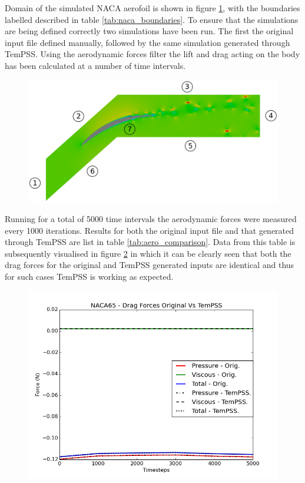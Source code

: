 \documentclass[11pt, a4paper]{report}
\begin{document}
Domain of the simulated NACA aerofoil is shown in figure \ref{fig:naca_domain}, with the boundaries labelled described in table \ref{tab:naca_boundaries}. To ensure that the simulations are being defined correctly two simulations have been run. The first the original input file defined manually, followed by the same simulation generated through TemPSS. Using the aerodynamic forces filter the lift and drag acting on the body has been calculated at a number of time intervals.

\begin{figure}[htb!]
 \centering
 \includegraphics[width=.75\linewidth,  clip=true, trim = 0cm 0cm 0cm 0cm]{naca_domain}
 \label{fig:naca_domain}
\end{figure}

Running for a total of 5000 time intervals the aerodynamic forces were measured every 1000 iterations. Results for both the original input file and that generated through TemPSS are list in table \ref{tab:aero_comparison}. Data from this table is subsequently visualised in figure \ref{fig:drag_lift_comparison} in which it can be clearly seen that both the drag forces for the original and TemPSS generated inputs are identical and thus for such cases TemPSS is working as expected.

\begin{figure}[htb!]
 \centering
 \includegraphics[width=.75\linewidth,  clip=true, trim = 0cm 0cm 0cm 0cm]{drag}
 \label{fig:drag_lift_comparison}
\end{figure}
\end{document}
